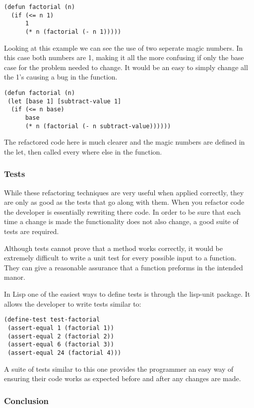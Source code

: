 \documentclass{article}
\begin{document}
\begin{verbatim}
(defun factorial (n)
  (if (<= n 1)
      1
      (* n (factorial (- n 1)))))
\end{verbatim}
 
Looking at this example we can see the use of two seperate magic numbers. In this case both numbers are 1, making it all the more confusing if only the base case for the problem needed to change. It would be an easy to simply change all the 1’s causing a bug in the function.

\begin{verbatim} 
(defun factorial (n)
 (let [base 1] [subtract-value 1]
  (if (<= n base)
      base
      (* n (factorial (- n subtract-value))))))
\end{verbatim}
 
The refactored code here is much clearer and the magic numbers are defined in the let, then called every where else in the function.
 
\subsubsection{Tests}
 
While these refactoring techniques are very useful when applied correctly, they are only as good as the tests that go along with them. When you refactor code the developer is essentially rewriting there code. In order to be sure that each time a change is made the functionality does not also change, a good suite of tests are required\cite{2}. 
 
Although tests cannot prove that a method works correctly, it would be extremely difficult to write a unit test for every possible input to a function. They can give a reasonable assurance that a function preforms in the intended manor. 
 
In Lisp one of the easiest ways to define tests is through the lisp-unit package. It allows the developer to write tests similar to:
 
\begin{verbatim}
(define-test test-factorial
 (assert-equal 1 (factorial 1))
 (assert-equal 2 (factorial 2))
 (assert-equal 6 (factorial 3))
 (assert-equal 24 (factorial 4)))
\end{verbatim}
 
A suite of tests similar to this one provides the programmer an easy way of ensuring their code works as expected before and after any changes are made. 
 
\subsubsection{Conclusion}
 
\end{document}
